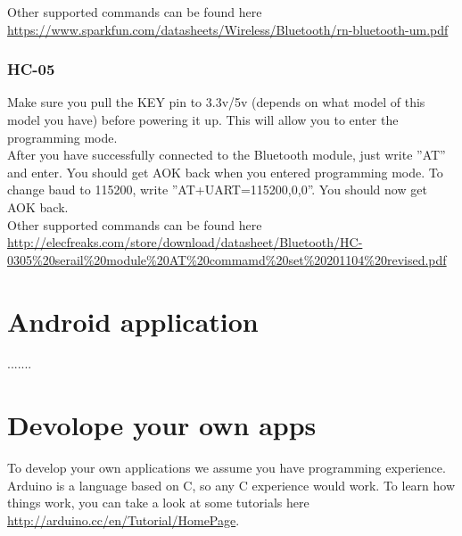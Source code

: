 				Other supported commands can be found here \url{https://www.sparkfun.com/datasheets/Wireless/Bluetooth/rn-bluetooth-um.pdf}

				\subsubsection{HC-05}
				Make sure you pull the KEY pin to 3.3v/5v (depends on what model of this model you have) before powering it up. This will allow you to enter the programming mode.\\
				
				After you have successfully connected to the Bluetooth module, just write ''AT'' and enter. You should get AOK back when you entered programming mode. To change baud to 115200, write ''AT+UART=115200,0,0''. You should now get AOK back.\\
				
				Other supported commands can be found here \url{http://elecfreaks.com/store/download/datasheet/Bluetooth/HC-0305%20serail%20module%20AT%20commamd%20set%20201104%20revised.pdf}
				
	\section{Android application}\label{sec:install-android-application}
	.......
	
	\section{Devolope your own apps}
	To develop your own applications we assume you have programming experience. Arduino is a language based on C, so any C experience would work. To learn how things work, you can take a look at some tutorials here \url{http://arduino.cc/en/Tutorial/HomePage}.\\